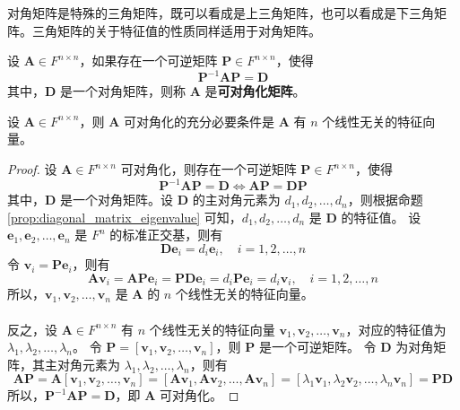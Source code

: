 \begin{note}
    对角矩阵是特殊的三角矩阵，既可以看成是上三角矩阵，也可以看成是下三角矩阵。三角矩阵的关于特征值的性质同样适用于对角矩阵。
\end{note}
\vspace{1em}

\begin{definition}
    设 $\mathbf{A} \in F^{n \times n}$，如果存在一个可逆矩阵 $\mathbf{P} \in F^{n \times n}$，使得
    \[
        \mathbf{P}^{-1}\mathbf{A}\mathbf{P} = \mathbf{D}
    \]
    其中，$\mathbf{D}$ 是一个对角矩阵，则称 $\mathbf{A}$ 是\textbf{可对角化矩阵}。
    \label{def:diagonalizable_matrix}
\end{definition}

\begin{proposition}[可对角化矩阵的充要条件]
    设 $\mathbf{A} \in F^{n \times n}$，则 $\mathbf{A}$ 可对角化的充分必要条件是 $\mathbf{A}$ 有 $n$ 个线性无关的特征向量。
    \label{prop:diagonalizable_matrix_necessary_sufficient_condition}
\end{proposition}

\begin{proof}
    设 $\mathbf{A} \in F^{n \times n}$ 可对角化，则存在一个可逆矩阵 $\mathbf{P} \in F^{n \times n}$，使得
    \[
        \mathbf{P}^{-1}\mathbf{A}\mathbf{P} = \mathbf{D} \iff \mathbf{A}\mathbf{P} = \mathbf{D}\mathbf{P}
    \]
    其中，$\mathbf{D}$ 是一个对角矩阵。设 $\mathbf{D}$ 的主对角元素为 $d_1,d_2,\ldots,d_n$，则根据命题 \ref{prop:diagonal_matrix_eigenvalue} 可知，$d_1,d_2,\ldots,d_n$ 是 $\mathbf{D}$ 的特征值。
    设 $\mathbf{e}_1,\mathbf{e}_2,\ldots,\mathbf{e}_n$ 是 $F^n$ 的标准正交基，则有
    \[
        \mathbf{D}\mathbf{e}_i = d_i \mathbf{e}_i, \quad i = 1,2,\ldots,n
    \]
    令 $\mathbf{v}_i = \mathbf{P}\mathbf{e}_i$，则有
    \[
        \mathbf{A}\mathbf{v}_i = \mathbf{A}\mathbf{P}\mathbf{e}_i = \mathbf{P}\mathbf{D}\mathbf{e}_i = d_i \mathbf{P}\mathbf{e}_i = d_i \mathbf{v}_i, \quad i = 1,2,\ldots,n
    \]
    所以，$\mathbf{v}_1,\mathbf{v}_2,\ldots,\mathbf{v}_n$ 是 $\mathbf{A}$ 的 $n$ 个线性无关的特征向量。
    \\
    \\
    反之，设 $\mathbf{A} \in F^{n \times n}$ 有 $n$ 个线性无关的特征向量 $\mathbf{v}_1,\mathbf{v}_2,\ldots,\mathbf{v}_n$，对应的特征值为 $\lambda_1,\lambda_2,\ldots,\lambda_n$。
    令 $\mathbf{P} = [\mathbf{v}_1,\mathbf{v}_2,\ldots,\mathbf{v}_n]$，则 $\mathbf{P}$ 是一个可逆矩阵。
    令 $\mathbf{D}$ 为对角矩阵，其主对角元素为 $\lambda_1,\lambda_2,\ldots,\lambda_n$，则有
    \[
        \mathbf{A}\mathbf{P} = \mathbf{A}[\mathbf{v}_1,\mathbf{v}_2,\ldots,\mathbf{v}_n] = [\mathbf{A}\mathbf{v}_1,\mathbf{A}\mathbf{v}_2,\ldots,\mathbf{A}\mathbf{v}_n] = [\lambda_1 \mathbf{v}_1,\lambda_2 \mathbf{v}_2,\ldots,\lambda_n \mathbf{v}_n] = \mathbf{P}\mathbf{D}
    \]
    所以，$\mathbf{P}^{-1}\mathbf{A}\mathbf{P} = \mathbf{D}$，即 $\mathbf{A}$ 可对角化。
\end{proof}

